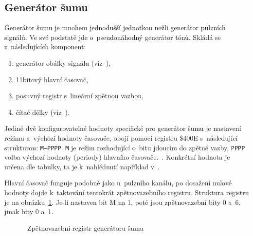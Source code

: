 \subsection{Generátor šumu}
Generátor šumu je mnohem jednodušší jednotkou nežli generátor pulzních signálů. Ve své podstatě jde o~pseudonáhodný generátor tónů. Skládá se z~následujících komponent:
\begin{enumerate}
	\item generátor obálky signálu (viz~\cite{Nesdev:apu-envelope}),
	\item 11bitový hlavní časovač,
	\item posuvný registr s~lineární zpětnou vazbou,
	\item čítač délky (viz~\cite{Nesdev:apu-length-counter}).
\end{enumerate}

Jediné dvě konfigurovatelné hodnoty specifické pro generátor šumu je nastavení režimu a~výchozí hodnoty časovače, obojí pomocí registru \$400E s~následující strukturou: \texttt{M---PPPP}. \texttt{M} je režim rozhodující o~bitu jdoucím do zpětné vazby, \texttt{PPPP} volba výchozí hodnoty (periody) hlavního časovače.~\cite{Nesdev:apu-noise}. Konkrétní hodnota je určena dle tabulky, ta je k~nahlédnutí například v~\cite{Nesdev:apu-noise}.

Hlavní časovač funguje podobně jako u~pulzního kanálu, po dosažení nulové hodnoty dojde k~taktování tentokrát zpětnovazebního registru. Struktura registru je na obrázku~\ref{fig:apu-sum-LFSR}. Je-li nastaven bit M na 1, poté jsou zpětnovazební bity 0 a~6, jinak bity 0 a~1.~\cite{Nesdev:apu-noise}

\begin{figure}[ht!]
	\centering
	\caption{~Zpětnovazební registr generátoru šumu}\label{fig:apu-sum-LFSR}
\end{figure}

